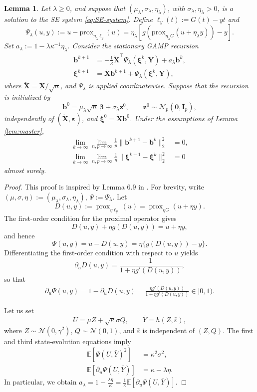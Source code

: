 \documentclass[12pt,reqno]{amsart}
\newtheorem{lemma}{Lemma}
\newcommand{\prox}{\mathrm{prox}}
\newcommand{\ccc}{\color{black}}
\begin{document}
{\ccc
\begin{lemma}
\label{lem:gamp-cauchy-unified}
Let $\lambda\ge 0$, and suppose that
$(\mu_\lambda,\sigma_\lambda,\eta_\lambda)$, with
$\sigma_\lambda,\eta_\lambda>0$, is a solution to the SE system \eqref{eq:SE-system}. Define $\ell_y(t):=G(t)-yt$
and
\[
\Psi_\lambda(u,y):=
u-{\prox}_{\eta_\lambda\ell_y}(u)
=\eta_\lambda
\left[
g\left(
{\prox}_{\eta_\lambda G}(u+\eta_\lambda y)
\right)-y
\right].
\]
Set $a_\lambda:=1-{\lambda\kappa^{-1}\eta_\lambda}.$
Consider the stationary GAMP recursion
\begin{align}
\bm b^{k+1}
&=-\frac{1}{\kappa}
\breve{\bm X}^{\top}
\Psi_\lambda(\bm\xi^k,\bm Y)
+a_\lambda\bm b^k,
\label{eq:stationary-gamp-b}\\
\bm\xi^{k+1}
&=\breve{\bm X}\bm b^{k+1}
+\Psi_\lambda(\bm\xi^k,\bm Y),
\label{eq:stationary-gamp-xi}
\end{align}
where $\breve{\bm X}=\bm X/\sqrt n$, and $\Psi_\lambda$ is applied
coordinatewise.
Suppose that the recursion is initialized by
\[
\bm b^0
=\mu_\lambda\sqrt n\,\bm\beta
+\sigma_\lambda\bm z^0,
\qquad
\bm z^0\sim\mathcal N_p(\bm0,\bm I_p),
\]
independently of $(\breve{\bm X},\bm\varepsilon)$, and
$\bm\xi^0=\breve{\bm X}\bm b^0$.
Under the assumptions of Lemma \ref{lem:master},
\begin{align}
\lim_{k\to\infty}
\lim_{n,p\to\infty}
\frac1p
\|\bm b^{k+1}-\bm b^k\|_2^2
&=0,
\label{eq:cauchy-b}\\
\lim_{k\to\infty}
\lim_{n,p\to\infty}
\frac1n
\|\bm\xi^{k+1}-\bm\xi^k\|_2^2
&=0
\label{eq:cauchy-xi}
\end{align}
almost surely.
\end{lemma}
\begin{proof}
This proof is inspired by Lemma 6.9 in \citep{donoho2016high}.
For brevity, write $(\mu,\sigma,\eta):=(\mu_\lambda,\sigma_\lambda,\eta_\lambda)$, $\Psi:=\Psi_\lambda$.
Let
\[
D(u,y)
:=
\operatorname{prox}_{\eta\ell_y}(u)
=
\operatorname{prox}_{\eta G}(u+\eta y).
\]
The first-order condition for the proximal operator gives
\[
D(u,y)+\eta g(D(u,y))=u+\eta y,
\]
and hence
\[
\Psi(u,y)
=
u-D(u,y)
=
\eta\{g(D(u,y))-y\}.
\]
Differentiating the first-order condition with respect to $u$ yields
\[
\partial_uD(u,y)
=
\frac{1}{1+\eta g'(D(u,y))},
\]
so that
\begin{align}
\partial_u\Psi(u,y)
=1-\partial_uD(u,y)
=\frac{\eta g'(D(u,y))}
     {1+\eta g'(D(u,y))}
\in[0,1).
\label{eq:Psi-derivative}
\end{align}

Let us set
\[
U=\mu Z+\sqrt{\kappa}\sigma Q,
\qquad
\bar Y=h(Z,\bar\varepsilon),
\]
where $Z\sim\mathcal N(0,\gamma^2)$,
$Q\sim\mathcal N(0,1)$, and
$\bar\varepsilon$ is independent of $(Z,Q)$.
The first and third state-evolution equations imply
\begin{align}
\mathbb E[\Psi(U,\bar Y)^2]
&=
\kappa^2\sigma^2,
\label{eq:Psi-second-moment}\\
\mathbb E[\partial_u\Psi(U,\bar Y)]
&=
\kappa-\lambda\eta.
\label{eq:Psi-derivative-mean}
\end{align}
In particular, we obtain
$
a_\lambda
=
1-\frac{\lambda\eta}{\kappa}
=
\frac{1}{\kappa}
\mathbb E[\partial_u\Psi(U,\bar Y)].
$


\end{proof}}
\end{document}
